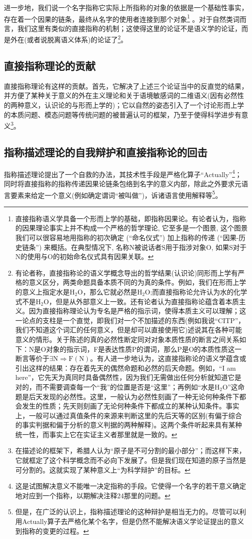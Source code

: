 \documentclass{article}
\begin{document}
进一步地，我们说一个名字指称它实际上所指称的对象的依据是一个基础性事实，存在着一个因果的链条，最终从名字的使用者连接到那个对象\footnote{直接指称语义学具备一个形而上学的基础，即指称因果论。有论者认为，指称的因果理论事实上并不构成一个严格的哲学理论, 它至多是一个图景, 这个图景我们可以很容易地用指称的初次确定 (“命名仪式”) 加上指称的传递 (“因果-历史链条”) 来概括。在典型情况下, 名称N被说话者S用于指涉对象O, 如果S对于N的使用与O的初始命名仪式具有因果关联。}
。对于自然类词而言，我们这里有类似的直接指称的机制；这使得这里的论证不是语义学的论证，而是外在(或者说脱离语义体系)的论证了\footnote{有论者称，直接指称论的语义学概念导出的哲学结果(认识论)同形而上学有严格的意义区分，两类命题具备本质不同的为真的条件。例如，我们在形而上学的意义上指定水是$\mathrm{H_2O}$，那么它就必然是$\mathrm{H_2O}$;而直接指称论允许认为水的化学式不是$\mathrm{H_2O}$，但是从外部意义上一致。还有论者认为直接指称论蕴含着本质主义。因为直接指称理论认为专名是严格的指示词，使得本质主义可以理解；这一论点的支柱是一个直觉，即我们对一个不加描述的东西(例如我说“CITP”，我们不知道这个词汇的任何意义，但是却可以直接使用它)述说其在各种可能意义的情形。关于陈述的真的必然性断定同对对象本质性质的断言之间关系如下：N是O对象的指示词，F是表达性质P的谓词，那么P是O的本质性质这一断言等价于$\exists \mathrm{N}\Rightarrow\mathrm{F(N)} $。有人进一步地认为，这直接指称论的语义学蕴含或引出这样的结果：存在着先天的偶然命题和必然的后天命题。例如，“I am here”，它先天为真同时具备偶然性，因为我们无需做出任何分析就知道它是对的，而不需要调查每一个“我”的位置是否是“这里”；再例如“水是$\mathrm{H_2O}$”这命题是后天发现的必然性。这里，一般认为必然性刻画了一种无论何种条件下都会发生的性质；先天则刻画了无论何种条件下都成立的某种认知条件。事实上，一般可以通过真值条件的来源来判断这里的先后天等的区别(有偏于综合的事实判据和偏于分析的意义判据的两种解释)。这两个条件听起来具有某种统一性，而事实上它在实证主义者那里就是一致的。}。
\subsection{直接指称理论的贡献}
直接指称理论有这样的贡献。首先，它解决了上述三个论证当中的反直觉的结果，并方便了某种关于意义的外在主义理论和关于语境敏感词的二维语义(因有必然性的两种意义，认识论的与形而上学的)；它以自然的姿态引入了一个讨论形而上学的本质问题、模态问题等传统问题的被普遍认可的框架，乃至于使得科学进步有意义\footnote{在描述论的框架下，希腊人认为“原子是不可分割的最小部分”；而这样下来，它就框定了这个科学概念而不必向下发展了。但是我们现在知道的原子当然是可分割的。这就实现了某种意义上“为科学辩护”的目标。}。
\subsection{指称描述理论的自我辩护和直接指称论的回击}
指称描述理论提出了一个自救的办法，其技术性手段是严格化算子“Actually”\footnote{这是试图解决意义不能唯一决定指称的手段。它使得一个名字的若干意义确定地对应到一个指称，以期解决注释24那里的问题。}；同时将直接指称的指称传递因果论链条包络到名字的意义内部，除此之外要求元语言要素来给定一个意义(例如确定谓词“被叫做”)，诉诸语言使用解释等\footnote{但是，在广泛的认识上，指称描述理论的这种辩护是相当无力的。尽管可以利用Actually算子去严格化某个名字，但是仍然不能解决语义学论证提出的意义到指称的变更的过程。}。
\end{document}
